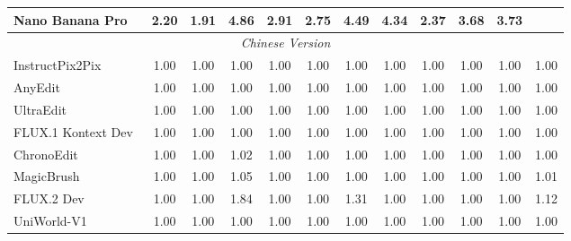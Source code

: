 \documentclass{llmxive}
\begin{document}
\begin{table}[t]
{\begin{tabular}{l|cccccccccc|c}
            
            Nano Banana Pro~\cite{nanobananapro}
            & 2.20 & 1.91 & 4.86 & 2.91 & 2.75 & 4.49 & 4.34 & 2.37 & 3.68 & 3.73
            &\cellcolor[HTML]{C8C8C8}{\textbf{3.35}} \\

            
 

            \midrule
            \multicolumn{12}{c}{\textit{Chinese Version}} \\
            \midrule

            InstructPix2Pix~\cite{brooks2023instructpix2pix}
            & 1.00 & 1.00 & 1.00 & 1.00 & 1.00 & 1.00 & 1.00 & 1.00 & 1.00 & 1.00
            & \cellcolor[HTML]{C8C8C8}1.00 \\


            AnyEdit~\cite{yu2025anyedit}
            & 1.00 & 1.00 & 1.00 & 1.00 & 1.00 & 1.00 & 1.00 & 1.00 & 1.00 & 1.00
            & \cellcolor[HTML]{C8C8C8}1.00 \\

            UltraEdit~\cite{zhao2024ultraedit}
            & 1.00 & 1.00 & 1.00 & 1.00 & 1.00 & 1.00 & 1.00 & 1.00 & 1.00 & 1.00
            & \cellcolor[HTML]{C8C8C8}1.00 \\

            FLUX.1 Kontext Dev~\cite{labs2025flux}
             & 1.00 & 1.00 & 1.00 & 1.00 & 1.00 & 1.00 & 1.00 & 1.00 & 1.00 & 1.00
            & \cellcolor[HTML]{C8C8C8}1.00 \\

            ChronoEdit~\cite{wu2025chronoedit}
            & 1.00 & 1.00 & 1.02 & 1.00 & 1.00 & 1.00 & 1.00 & 1.00 & 1.00 & 1.00
            & \cellcolor[HTML]{C8C8C8}1.00 \\

            MagicBrush~\cite{zhang2023magicbrush}
            & 1.00 & 1.00 & 1.05 & 1.00 & 1.00 & 1.00 & 1.00 & 1.00 & 1.00 & 1.00
            & \cellcolor[HTML]{C8C8C8}1.01 \\

            FLUX.2 Dev~\cite{flux-2-2025}
            & 1.00 & 1.00 & 1.84 & 1.00 & 1.00 & 1.31 & 1.00 & 1.00 & 1.00 & 1.00
            & \cellcolor[HTML]{C8C8C8}1.12  \\

            \midrule

            UniWorld-V1~\cite{lin2025uniworld}
            & 1.00 & 1.00 & 1.00 & 1.00 & 1.00 & 1.00 & 1.00 & 1.00 & 1.00 & 1.00
            & \cellcolor[HTML]{C8C8C8}1.00 \\


\end{tabular}}
\end{table}
\end{document}
